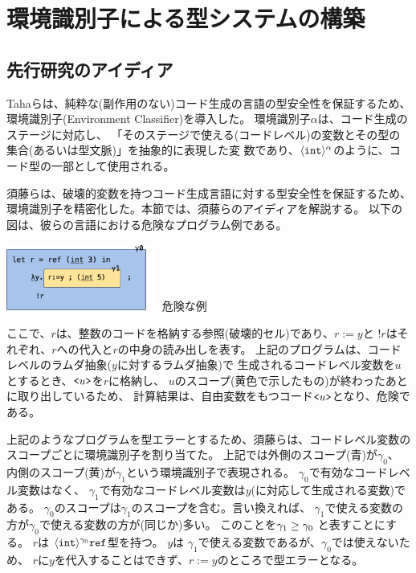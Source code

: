 
\section{環境識別子による型システムの構築}

\subsection{先行研究のアイディア}

Tahaら\cite{Taha:2003:EC:604131.604134}は、純粋な(副作用のない)コード生成の言語の型安全性を保証するため、
環境識別子(Environment Classifier)を導入した。
環境識別子$\alpha$は、コード生成のステージに対応し、
「そのステージで使える(コードレベル)の変数とその型の集合(あるいは型文脈)」を抽象的に表現した変
数であり、$\langle{\mbox{\texttt{int}}}\rangle^{\alpha}$のように、コード型の一部として使用される。

須藤ら\cite{Sudo2014}は、破壊的変数を持つコード生成言語に対する型安全性を保証するため、
環境識別子を精密化した。本節では、須藤らのアイディアを解説する。
以下の図は、彼らの言語における危険なプログラム例である。
\begin{center}
  \includegraphics[clip,width=5cm]{./img/sudo_ref.png}
 危険な例
\end{center}
ここで、$r$は、整数のコードを格納する参照(破壊的セル)であり、$r:=y$と
$!r$はそれぞれ、$r$への代入と$r$の中身の読み出しを表す。
上記のプログラムは、コードレベルのラムダ抽象($y$に対するラムダ抽象)で
生成されるコードレベル変数を$u$とするとき、$\texttt{<}{u}\texttt{>}$を$r$に格納し、
$u$のスコープ(黄色で示したもの)が終わったあとに取り出しているため、
計算結果は、自由変数をもつコード$\texttt{<}{u}\texttt{>}$となり、危険である。

上記のようなプログラムを型エラーとするため、須藤らは、コードレベル変数の
スコープごとに環境識別子を割り当てた。
上記では外側のスコープ(青)が$\gamma_0$、
内側のスコープ(黄)が$\gamma_1$という環境識別子で表現される。
$\gamma_0$で有効なコードレベル変数はなく、
$\gamma_1$で有効なコードレベル変数は$y$(に対応して生成される変数)である。
$\gamma_0$のスコープは$\gamma_1$のスコープを含む。言い換えれば、
$\gamma_1$で使える変数の方が$\gamma_0$で使える変数の方が(同じか)多い。
このことを$\gamma_1 \ge \gamma_0$ と表すことにする。
$r$は $\langle{\mbox{\texttt{int}}}\rangle^{\gamma_0} \mbox{\texttt{ref}}$型を持つ。
$y$は $\gamma_1$で使える変数であるが、$\gamma_0$では使えないため、
$r$に$y$を代入することはできず、$r:=y$のところで型エラーとなる。

